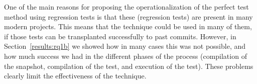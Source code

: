 

One of the main reasons for proposing the operationalization of the perfect test method using regression tests is that these (regression tests) are present in many modern projects. This means that the technique could be used in many of them, if those tests can be transplanted successfully to past commits. However, in Section~\ref{results:rq1b} we showed how in many cases this was not possible, and how much success we had in the different phases of the process (compilation of the snapshot, compilation of the test, and execution of the test). These problems clearly limit the effectiveness of the technique.

